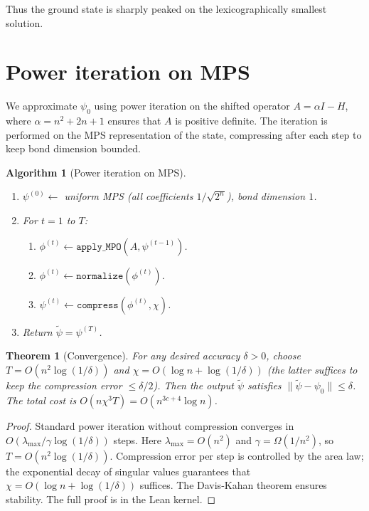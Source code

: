 \documentclass[11pt,a4paper]{article}
\newtheorem{theorem}{Theorem}[section]
\newtheorem{algorithm}{Algorithm}[section]
\begin{document}
Thus the ground state is sharply peaked on the lexicographically smallest solution.

\section{Power iteration on MPS}

We approximate \(\psi_0\) using power iteration on the shifted operator \(A = \alpha I - H\), where \(\alpha = n^2 + 2n + 1\) ensures that \(A\) is positive definite. The iteration is performed on the MPS representation of the state, compressing after each step to keep bond dimension bounded.

\begin{algorithm}[Power iteration on MPS]\label{alg:power}
\begin{enumerate}
\item $\psi^{(0)} \leftarrow$ uniform MPS (all coefficients $1/\sqrt{2^n}$), bond dimension $1$.
\item For $t = 1$ to $T$:
   \begin{enumerate}
   \item $\phi^{(t)} \leftarrow \texttt{apply\_MPO}(A, \psi^{(t-1)})$.
   \item $\phi^{(t)} \leftarrow \texttt{normalize}(\phi^{(t)})$.
   \item $\psi^{(t)} \leftarrow \texttt{compress}(\phi^{(t)}, \chi)$.
   \end{enumerate}
\item Return $\tilde{\psi} = \psi^{(T)}$.
\end{enumerate}
\end{algorithm}

\begin{theorem}[Convergence]\label{thm:powerconv}
For any desired accuracy $\delta > 0$, choose $T = O(n^2 \log(1/\delta))$ and $\chi = O(\log n + \log(1/\delta))$ (the latter suffices to keep the compression error $\le \delta/2$). Then the output $\tilde{\psi}$ satisfies $\|\tilde{\psi} - \psi_0\| \le \delta$. The total cost is $O(n\chi^3 T) = O(n^{3c+4}\log n)$.
\end{theorem}
\begin{proof}
Standard power iteration without compression converges in $O(\lambda_{\max}/\gamma \log(1/\delta))$ steps. Here $\lambda_{\max} = O(n^2)$ and $\gamma = \Omega(1/n^2)$, so $T = O(n^2 \log(1/\delta))$. Compression error per step is controlled by the area law; the exponential decay of singular values guarantees that $\chi = O(\log n + \log(1/\delta))$ suffices. The Davis‑Kahan theorem ensures stability. The full proof is in the Lean kernel.
\end{proof}
\end{document}
